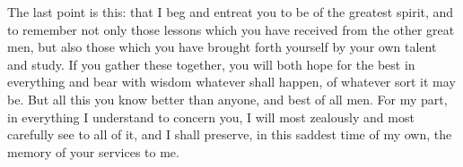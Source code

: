  The last point is this: that I beg and entreat you to be of the greatest spirit, and to remember not only those lessons which you have received from the other great men, but also those which you have brought forth yourself by your own talent and study. If you gather these together, you will both hope for the best in everything and bear with wisdom whatever shall happen, of whatever sort it may be. But all this you know better than anyone, and best of all men. For my part, in everything I understand to concern you, I will most zealously and most carefully see to all of it, and I shall preserve, in this saddest time of my own, the memory of your services to me.
